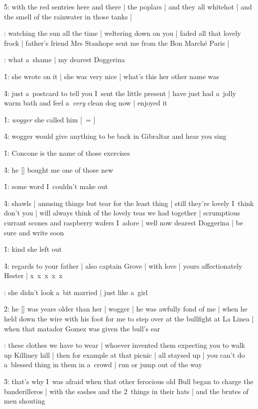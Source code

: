 \f5:
with the red sentries here and there |
the poplars |
and they all whitehot |
and the smell of the rainwater in those tanks |

:
watching the sun all the time |
weltering down on you |
faded all that lovely frock |
father's friend Mrs Stanhope sent me from the Bon Marché Paris |

:
what a~shame |
my dearest Doggerina

\f1:
she wrote on it |
she was very nice |
what's this her other name was

\f4:
just a~postcard to tell you I~sent the little present |
have just had a~jolly warm bath and feel a~\emph{very} clean dog now |
enjoyed it

\f1:
\emph{wogger} she called him [\stanhope\ = \wogger]

\f4:
wogger would give anything to be back in Gibraltar
and hear you sing 

\f1:
Concone is the name of those exercises

\f4:
he [\wogger] bought me one of those new

\f1:
some word I~couldn't make out

\f4:
shawls |
amusing things but tear for the least thing |
still they're lovely I~think don't you |
will always think of the lovely teas we had together |
scrumptious currant scones and raspberry wafers I~adore |
well now dearest Doggerina |
be sure and write soon

\f1:
kind she left out

\f4:
regards to your father |
also captain Grove |
with love |
yours affectionately Hester |
x~x~x~x~x

:
she didn't look a~bit married |
just like a~girl

\f2:
he [\wogger] was years older than her |
wogger |
he was awfully fond of me |
when he held down the wire with his foot for me to step over at the bullfight at La Linea |
when that matador Gomez was given the bull's ear

:
these clothes we have to wear |
whoever invented them expecting you to walk up Killiney hill |
then for example at that picnic |
all staysed up |
you can't do a~blessed thing in them in a~crowd |
run or jump out of the way

\f3:
that's why I~was afraid
when that other ferocious old Bull began to charge the banderilleros |
with the sashes and the 2~things in their hats |
and the brutes of men shouting

